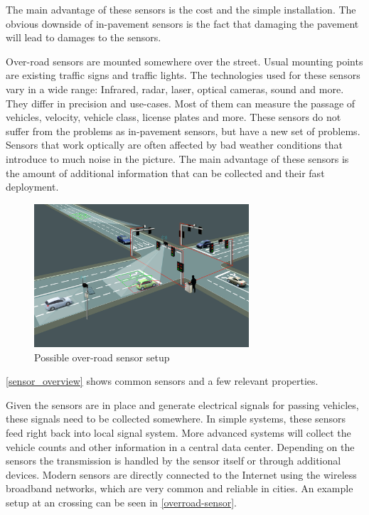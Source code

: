 The main advantage of these sensors is the cost and the simple installation. The obvious downside of in-pavement sensors is the fact that damaging the pavement will lead to damages to the sensors.

Over-road sensors are mounted somewhere over the street. Usual mounting points are existing traffic signs and traffic lights. The technologies used for these sensors vary in a wide range: Infrared, radar, laser, optical cameras, sound and more. They differ in precision and use-cases. Most of them can measure the passage of vehicles, velocity, vehicle class, license plates and more. These sensors do not suffer from the problems as in-pavement sensors, but have a new set of problems. Sensors that work optically are often affected by bad weather conditions that introduce to much noise in the picture. The main advantage of these sensors is the amount of additional information that can be collected and their fast deployment.

\begin{figure}[ht]
	\centering
	\includegraphics[width=8cm]{figures/overroad-sensor}
	\caption{Possible over-road sensor setup}
	\label{overroad-sensor}
\end{figure}

\autoref{sensor_overview} shows common sensors and a few relevant properties.

Given the sensors are in place and generate electrical signals for passing vehicles, these signals need to be collected somewhere. In simple systems, these sensors feed right back into local signal system. More advanced systems will collect the vehicle counts and other information in a central data center. Depending on the sensors the transmission is handled by the sensor itself or through additional devices. Modern sensors are directly connected to the Internet using the wireless broadband networks, which are very common and reliable in cities. An example setup at an crossing can be seen in \autoref{overroad-sensor}.

